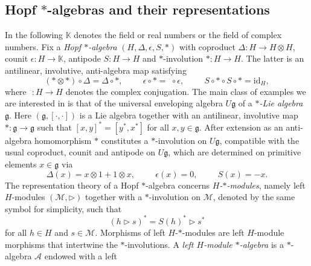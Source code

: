 \documentclass[a4paper,11pt]{article}
\begin{document}
\subsection{Hopf \texorpdfstring{$*$}{*}-algebras and their representations}
\label{HopfA}

In the following $\mathbb{K}$ denotes the field or real numbers or the field of complex
numbers. Fix a \textit{Hopf $*$-algebra} $(H,\Delta,\epsilon,S,*)$ with coproduct
$\Delta\colon H\rightarrow H\otimes H$, counit $\epsilon\colon H\rightarrow\mathbb{K}$,
antipode $S\colon H\rightarrow H$ and $*$-involution $*\colon H\rightarrow H$.
The latter is an antilinear, involutive, anti-algebra map satisfying
\begin{equation}
    (*\otimes *)\circ\Delta=\Delta\circ*,\hspace{1cm}
    \epsilon\circ *={}^{\overline{~}}\circ\epsilon,\hspace{1cm}
    S\circ*\circ S\circ*=\mathrm{id}_H,
\end{equation}
where ${}^{\overline{~}}\colon H\rightarrow H$ denotes the complex conjugation.
The main class of examples we are interested in is that of the universal enveloping
algebra $U\mathfrak{g}$ of a \textit{$*$-Lie algebra} $\mathfrak{g}$. Here 
$(\mathfrak{g},[\cdot,\cdot])$ is a Lie algebra together with an antilinear, involutive
map $*\colon\mathfrak{g}\rightarrow\mathfrak{g}$ such that $[x,y]^*=[y^*,x^*]$ for all
$x,y\in\mathfrak{g}$. After extension as an anti-algebra homomorphism $*$ constitutes a
$*$-involution on $U\mathfrak{g}$, compatible with the usual coproduct, counit and antipode
on $U\mathfrak{g}$, which are determined on primitive elements $x\in\mathfrak{g}$ via
\begin{equation}
    \Delta(x)=x\otimes 1+1\otimes x,\hspace{1cm}
    \epsilon(x)=0,\hspace{1cm}
    S(x)=-x.
\end{equation}
The representation theory of a Hopf $*$-algebra concerns \textit{$H$-$*$-modules}, 
namely left $H$-modules $(\mathcal{M},\rhd)$
together with a $*$-involution on $\mathcal{M}$,
denoted by the same symbol for simplicity, such that
\begin{equation}
    (h\rhd s)^*=S(h)^*\rhd s^*
\end{equation}
for all $h\in H$ and $s\in\mathcal{M}$. Morphisms of left $H$-$*$-modules are
left $H$-module morphisms that intertwine the $*$-involutions.
A \textit{left $H$-module $*$-algebra} is a $*$-algebra $\mathcal{A}$ endowed with a left 
\end{document}

